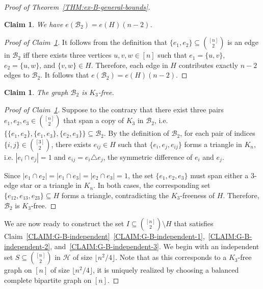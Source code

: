 \documentclass[11pt,a4paper]{article}
\newtheorem{claim}[definition]{Claim}
\newcommand{\graph}{H}
\begin{document}
\begin{proof}[Proof of Theorem~\ref{THM:ex-B-general-bounds}]
    \begin{claim}\label{CLAIM:B2-size-upper-bound}
        We have $e(\mathcal{B}_{2}) = e(\graph)(n-2)$.
    \end{claim}
    \begin{proof}[Proof of Claim~\ref{CLAIM:B2-size-upper-bound}]
        It follows from the definition that $\{e_1, e_2\} \subseteq \binom{[n]}{2}$ is an edge in $\mathcal{B}_{2}$ iff there exists three vertices $u, v, w \in [n]$ such that $e_1 = \{u,v\}$, $e_2 = \{u,w\}$, and $\{v,w\} \in \graph$. 
        Therefore, each edge in $\graph$ contributes exactly $n-2$ edges to $\mathcal{B}_{2}$. 
        It follows that $e(\mathcal{B}_{2}) = e(\graph)(n-2)$. 
    \end{proof}%

    
    \begin{claim}\label{CLAIM:B2-K3-free}
        The graph $\mathcal{B}_{2}$ is $K_{3}$-free. 
    \end{claim}
    \begin{proof}[Proof of Claim~\ref{CLAIM:B2-K3-free}]
        Suppose to the contrary that there exist three pairs $e_1, e_2, e_3 \in \binom{[n]}{2}$ that span a copy of $K_{3}$ in $\mathcal{B}_{2}$, i.e. $\big\{\{e_1, e_2\}, \{e_1, e_3\}, \{e_2, e_3\} \big\} \subseteq \mathcal{B}_{2}$. 
        By the definition of $\mathcal{B}_{2}$, for each pair of indices $\{i,j\} \in \binom{[3]}{2}$, there exists $e_{ij} \in \graph$ such that $\{ e_i, e_j, e_{ij} \}$ forms a triangle in $K_{n}$, i.e. $|e_i \cap e_j| = 1$ and $e_{ij} = e_i \triangle e_j$, the symmetric difference of $e_i$ and $e_j$. 

        Since $|e_1 \cap e_2| = |e_1 \cap e_3| = |e_2 \cap e_3| = 1$, the set $\{e_1, e_2, e_3\}$ must span either a $3$-edge star or a triangle in $K_{n}$. 
        In both cases, the corresponding set $\{e_{12}, e_{13}, e_{23}\} \subseteq \graph$ forms a triangle, contradicting the $K_{3}$-freeness of $\graph$. 
        Therefore, $\mathcal{B}_{2}$ is $K_{3}$-free.
    \end{proof}%

    We are now ready to construct the set $I \subseteq \binom{[n]}{2} \setminus \graph$ that satisfies Claim~\ref{CLAIM:G-B-independent}~\ref{CLAIM:G-B-independent-1},~\ref{CLAIM:G-B-independent-2}, and~\ref{CLAIM:G-B-independent-3}.  
    We begin with an independent set $S \subseteq \binom{[n]}{2}$ in $\mathcal{H}$ of size $\lfloor n^2/4 \rfloor$. Note that as this corresponds to a $K_{3}$-free graph on $[n]$ of size $\lfloor n^2/4 \rfloor$, it is uniquely realized by choosing a balanced complete bipartite graph on $[n]$.
    

\end{proof}
\end{document}
